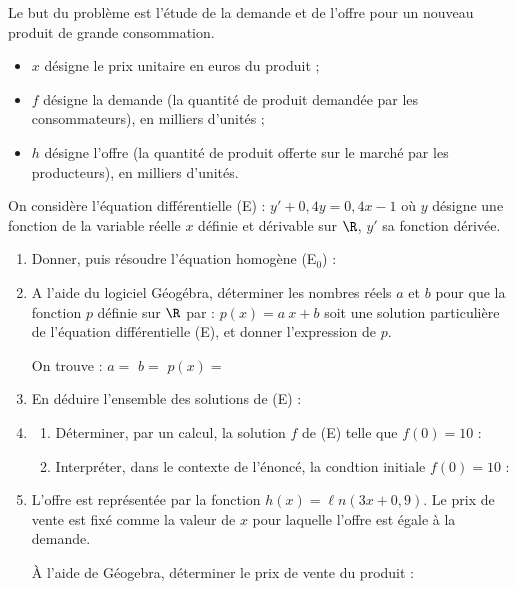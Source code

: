 Le but du problème est l’étude de la demande et de l’offre pour un nouveau produit
de grande consommation.

\begin{itemize}[$\bullet$]
	\item $x$ désigne le prix unitaire en euros du produit ;
	\item $f$ désigne la demande (la quantité de produit demandée par les consommateurs),
en milliers d’unités ;
	\item $h$ désigne l’offre (la quantité de produit offerte sur le marché par les producteurs),
en milliers d’unités.
\end{itemize}





On considère l’équation différentielle (E) : $y' + 0,4 y = 0,4x-1$ où $y$ désigne une fonction de la variable réelle $x$ définie et dérivable sur $\R$, $y'$ sa fonction dérivée.

\begin{enumerate}
	\item Donner, puis résoudre l'équation homogène (E$_0$) :\sautp
	
	\item A l’aide du logiciel Géogébra, déterminer les nombres réels $a$ et $b$ pour que la fonction $p$ définie sur $\R$ par : $p(x) = a~x+b$ soit une solution particulière de l'équation différentielle (E), et donner l’expression de $p$. 

	
	On trouve : \hfill $a=$\makebox[0.1\linewidth]{\dotfill} \hfill $b=$\makebox[0.1\linewidth]{\dotfill} \hfill $p(x)=$\makebox[0.3\linewidth]{\dotfill}

	\smallskip
	
	\appelprof
	
	\item En déduire l'ensemble des solutions de (E) : \sautp
	
	\item \begin{enumerate}
		\item Déterminer, par un calcul, la solution $f$ de (E) telle que $f(0)=10$ : \sautp
	
		\item Interpréter, dans le contexte de l'énoncé, la condtion initiale $f(0)=10$ :\sautp
	
	\end{enumerate}
	
	
	\item L'offre est représentée par la fonction $h(x) = \ell n(3x + 0, 9)$. Le prix de vente est fixé comme la valeur de $x$ pour laquelle l'offre est égale à la demande.\sautm
	
	À l'aide de Géogebra, déterminer le prix de vente du produit : \dotfill
	

\end{enumerate}